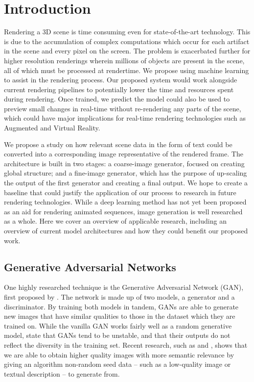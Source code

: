 \documentclass{article}
\begin{document}
\section{Introduction}
\label{sec:introduction}
Rendering a 3D scene is time consuming
even for state-of-the-art technology. This is due to the
accumulation of complex computations which occur for each
artifact in the scene and every pixel on the screen. The problem is exacerbated
further for higher resolution renderings wherein millions of objects are present
in the scene, all of which must be processed at rendertime.
We propose using machine learning to assist in the rendering process.
Our proposed system would work alongside current rendering pipelines
to potentially lower the time and resources spent during rendering.
Once trained, we predict the model could also be used to preview small changes in
real-time without re-rendering any parts of the scene, which could have major
implications for real-time rendering technologies such as Augmented and Virtual
Reality.

We propose a study on how relevant scene data in the form of text could be
converted into a corresponding image representative of the rendered frame.
The architecture is built in two stages: a coarse-image generator, focused on
creating global structure; and a fine-image generator, which has the purpose
of up-scaling the output of the first generator and creating a final output.
We hope to create a baseline that could justify the application of our process
to research in future rendering technologies.
While a deep learning method has not yet been proposed as an aid for rendering
animated sequences, image generation is well researched as a whole.
Here we cover an overview of applicable research,
including an overview of current model architectures and how they could benefit
our proposed work.

\subsection{Generative Adversarial Networks}
\label{subsec:gan}
One highly researched technique is the Generative Adversarial Network (GAN),
first proposed by \cite{generative_adversarial_networks}.
The network is made up of two models,
a generator and a discriminator.
By training both models in tandem,
GANs are able to generate new images that have similar qualities to
those in the dataset which they are trained on.
While the vanilla GAN works fairly well as a random generative model,
\cite{image_transformer} state that GANs
tend to be unstable,
and that their outputs
do not reflect the diversity in the training set.
Recent research, such as \cite{texture_synthesis} and \cite{multiscale_video},
shows that we are able to obtain
higher quality images with more semantic relevance by giving
an algorithm non-random seed data
-- such as a low-quality image or textual description -- to generate from.
\end{document}
